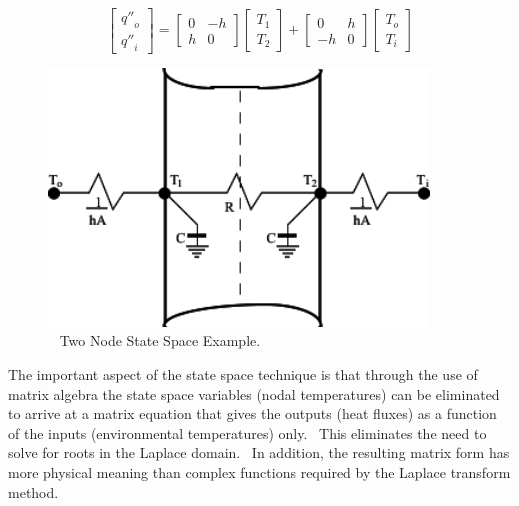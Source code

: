 \begin{equation}
\left[\begin{array}{c}{q''}_o \\ {q''}_i\end{array}\right] = 
    \left[\begin{array}{cc}0 & -h \\ h & 0\end{array}\right] \left[\begin{array}{c}T_1 \\ T_2\end{array}\right] +
    \left[\begin{array}{cc}0 & h \\ -h & 0\end{array}\right] \left[\begin{array}{c}T_o \\ T_i\end{array}\right]
\end{equation}

\begin{figure}[hbtp] %
\centering
\includegraphics[width=0.9\textwidth, height=0.9\textheight, keepaspectratio=true]{media/image168.svg.png}
\caption{  Two Node State Space Example. \protect \label{fig:two-node-state-space-example.}}
\end{figure}

The important aspect of the state space technique is that through the use of matrix algebra the state space variables (nodal temperatures) can be eliminated to arrive at a matrix equation that gives the outputs (heat fluxes) as a function of the inputs (environmental temperatures) only.~ This eliminates the need to solve for roots in the Laplace domain.~ In addition, the resulting matrix form has more physical meaning than complex functions required by the Laplace transform method.

